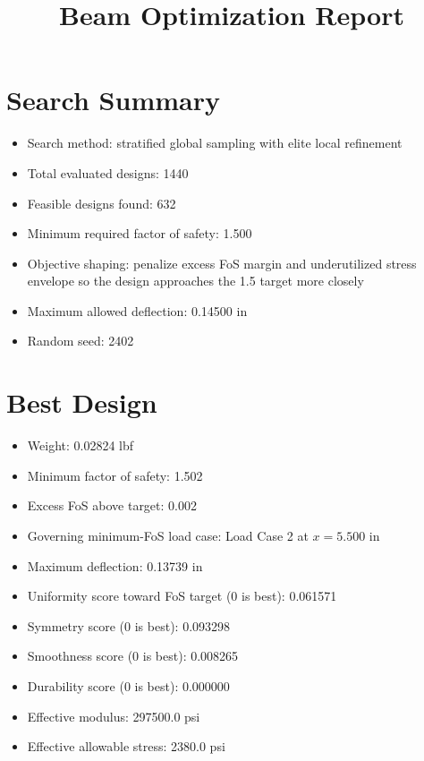 \documentclass[11pt]{article}
\title{Beam Optimization Report}
\date{}
\begin{document}
\maketitle

\section*{Search Summary}
\begin{itemize}
\item Search method: stratified global sampling with elite local refinement
\item Total evaluated designs: 1440
\item Feasible designs found: 632
\item Minimum required factor of safety: 1.500
\item Objective shaping: penalize excess FoS margin and underutilized stress envelope so the design approaches the 1.5 target more closely
\item Maximum allowed deflection: 0.14500 in
\item Random seed: 2402
\end{itemize}

\section*{Best Design}
\begin{itemize}
\item Weight: 0.02824 lbf
\item Minimum factor of safety: 1.502
\item Excess FoS above target: 0.002
\item Governing minimum-FoS load case: Load Case 2 at $x=5.500$ in
\item Maximum deflection: 0.13739 in
\item Uniformity score toward FoS target (0 is best): 0.061571
\item Symmetry score (0 is best): 0.093298
\item Smoothness score (0 is best): 0.008265
\item Durability score (0 is best): 0.000000
\item Effective modulus: 297500.0 psi
\item Effective allowable stress: 2380.0 psi
\end{itemize}
\end{document}
